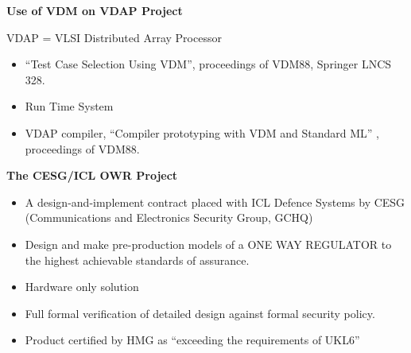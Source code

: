 \begin{slide}{}
\begin{center}

{\bf Use of VDM on VDAP Project}

VDAP = VLSI Distributed Array Processor

\end{center}

\begin{itemize}
\item
``Test Case Selection Using VDM'', proceedings of VDM88, Springer LNCS 328.
\item
Run Time System
\item
VDAP compiler, ``Compiler prototyping with VDM and Standard ML'' , proceedings of VDM88.
\end{itemize}

\end{slide}


\begin{slide}{}
\begin{center}
{\bf The CESG/ICL OWR Project}

\begin{itemize}
\item
A design-and-implement contract placed with ICL Defence Systems by CESG (Communications and Electronics Security Group, GCHQ)
\item
Design and make pre-production models of a ONE WAY REGULATOR to the highest achievable standards of assurance.
\item
Hardware only solution
\item
Full formal verification of detailed design against formal security policy.
\item
Product certified by HMG as ``exceeding the requirements of UKL6''
\end{itemize}
\end{center}
\end{slide}


